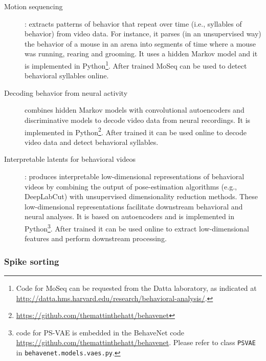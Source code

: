 \documentclass[a4paper,11point]{article}
\begin{document}
\begin{description}

    \item[Motion sequencing]\citep[MoSeq;][]{wiltschkoEtAl15}: extracts patterns
        of behavior that repeat over time (i.e., syllables of behavior) from
        video data. For instance, it parses (in an unsupervised way) the
        behavior of a mouse in an arena into segments of time where a mouse
        was running, rearing and grooming. It uses a hidden Markov model and it
        is implemented in Python\footnote{Code for MoSeq can be requested from
        the Datta laboratory, as indicated at
        \href{http://datta.hms.harvard.edu/research/behavioral-analysis/}{http://datta.hms.harvard.edu/research/behavioral-analysis/}.}.
        After trained MoSeq can be used to detect behavioral syllables online.

    \item[Decoding behavior from neural
        activity]\citep[BehaveNet;][]{battyEtAl19} combines hidden Markov
        models with convolutional autoencoders and discriminative models to
        decode video data from neural recordings. It is implemented in
        Python\footnote{\href{https://github.com/themattinthehatt/behavenet}{https://github.com/themattinthehatt/behavenet}}.
        After trained it can be used online to decode video data and detect
        behavioral syllables.

    \item[Interpretable latents for behavioral videos]\citep[Partitioned
        Subspace Variational Autoencoder, PS-VAE;][]{whitewayEtAl21}: produces
        interpretable low-dimensional representations of behavioral videos by
        combining the output of pose-estimation algorithms (e.g., DeepLabCut)
        with unsupervised dimensionality reduction methods. These
        low-dimensional representations facilitate downstream behavioral and
        neural analyses. It is based on autoencoders and is implemented in
        Python\footnote{code for PS-VAE is embedded in the BehaveNet code
        \href{https://github.com/themattinthehatt/behavenet}{https://github.com/themattinthehatt/behavenet}.
        Please refer to class \texttt{PSVAE} in 
        \texttt{behavenet.models.vaes.py}.}. After trained it can be used
        online to extract low-dimensional features and perform downstream
        processing.

\end{description}

\subsubsection{Spike sorting}
\label{sec:spikeSorting}
\end{document}
